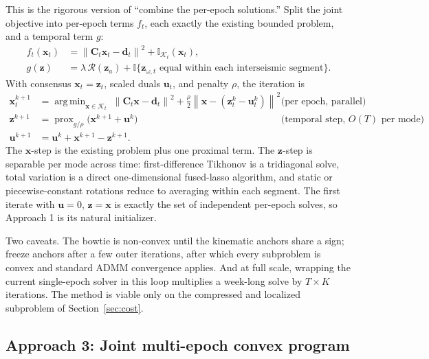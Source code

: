 \documentclass[11pt]{article}
\newcommand{\vect}[1]{\bm{#1}}
\newcommand{\mat}[1]{\mathbf{#1}}
\newcommand{\norm}[1]{\left\lVert #1 \right\rVert}
\DeclareMathOperator*{\argmin}{arg\,min}
\DeclareMathOperator{\prox}{prox}
\begin{document}
This is the rigorous version of ``combine the per-epoch solutions.'' Split the joint objective into per-epoch terms $f_t$, each exactly the existing bounded problem, and a temporal term $g$:
\begin{align}
f_t(\vect{x}_t) &= \norm{\mat{C}_t\vect{x}_t - \vect{d}_t}^2 + \mathbb{I}_{\mathcal{K}_t}(\vect{x}_t), \\
g(\vect{z}) &= \lambda\, \mathcal{R}(\vect{z}_a) + \mathbb{I}\{\vect{z}_{\omega,t} \text{ equal within each interseismic segment}\}.
\end{align}
With consensus $\vect{x}_t = \vect{z}_t$, scaled duals $\vect{u}_t$, and penalty $\rho$, the iteration is
\begin{align}
\vect{x}_t^{k+1} &= \argmin_{\vect{x} \in \mathcal{K}_t}\; \norm{\mat{C}_t\vect{x} - \vect{d}_t}^2 + \tfrac{\rho}{2}\norm{\vect{x} - (\vect{z}_t^k - \vect{u}_t^k)}^2
&& \text{(per epoch, parallel)} \label{eq:admm-x}\\
\vect{z}^{k+1} &= \prox_{g/\rho}\!\bigl(\vect{x}^{k+1} + \vect{u}^k\bigr)
&& \text{(temporal step, } O(T) \text{ per mode)} \\
\vect{u}^{k+1} &= \vect{u}^k + \vect{x}^{k+1} - \vect{z}^{k+1}.
\end{align}
The $\vect{x}$-step is the existing problem plus one proximal term. The $\vect{z}$-step is separable per mode across time: first-difference Tikhonov is a tridiagonal solve, total variation is a direct one-dimensional fused-lasso algorithm, and static or piecewise-constant rotations reduce to averaging within each segment. The first iterate with $\vect{u} = 0$, $\vect{z} = \vect{x}$ is exactly the set of independent per-epoch solves, so Approach 1 is its natural initializer.

Two caveats. The bowtie is non-convex until the kinematic anchors share a sign; freeze anchors after a few outer iterations, after which every subproblem is convex and standard ADMM convergence applies. And at full scale, wrapping the current single-epoch solver in this loop multiplies a week-long solve by $T \times K$ iterations. The method is viable only on the compressed and localized subproblem of Section~\ref{sec:cost}.

\subsection{Approach 3: Joint multi-epoch convex program}
\end{document}
